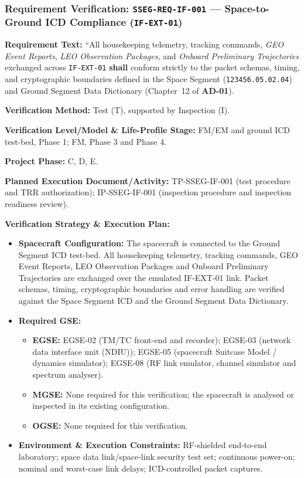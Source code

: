 \subsubsection{Requirement Verification: \texttt{SSEG-REQ-IF-001} --- Space-to-Ground ICD Compliance (\texttt{IF-EXT-01})}
\label{ver:SSEG-REQ-IF-001}
\textbf{Requirement Text:} ``All  housekeeping telemetry, tracking commands, \emph{GEO Event Reports}, \emph{LEO Observation Packages}, and \emph{Onboard Preliminary Trajectories} exchanged across \texttt{IF-EXT-01} \textbf{shall} conform strictly to the packet schemas, timing, and cryptographic boundaries defined in the Space Segment  (\texttt{123456.05.02.04}) and Ground Segment Data Dictionary (Chapter~12 of \textbf{AD-01}).
\par\textbf{Verification Method:} Test (T), supported by Inspection (I).
\par\textbf{Verification Level/Model \& Life-Profile Stage:} FM/EM and ground ICD test-bed, Phase 1; FM, Phase 3 and Phase 4.
\par\textbf{Project Phase:} C, D, E.
\par\textbf{Planned Execution Document/Activity:} TP-SSEG-IF-001 (test procedure and TRR authorization); IP-SSEG-IF-001 (inspection procedure and inspection readiness review).
\par\textbf{Verification Strategy \& Execution Plan:}
\begin{itemize}
\item \textbf{Spacecraft Configuration:} The spacecraft is connected to the Ground Segment ICD test-bed. All housekeeping telemetry, tracking commands, GEO Event Reports, LEO Observation Packages and Onboard Preliminary Trajectories are exchanged over the emulated IF-EXT-01 link. Packet schemas, timing, cryptographic boundaries and error handling are verified against the Space Segment ICD and the Ground Segment Data Dictionary.
\item \textbf{Required GSE:}
\begin{itemize}
\item \textbf{EGSE:} EGSE-02 (TM/TC front-end and recorder); EGSE-03 (network data interface unit (NDIU)); EGSE-05 (spacecraft Suitcase Model / dynamics simulator); EGSE-08 (RF link emulator, channel simulator and spectrum analyser).
\item \textbf{MGSE:} None required for this verification; the spacecraft is analysed or inspected in its existing configuration.
\item \textbf{OGSE:} None required for this verification.
\end{itemize}
\item \textbf{Environment \& Execution Constraints:} RF-shielded end-to-end laboratory; space data link/space-link security test set; continuous power-on; nominal and worst-case link delays; ICD-controlled packet captures.
\end{itemize}
